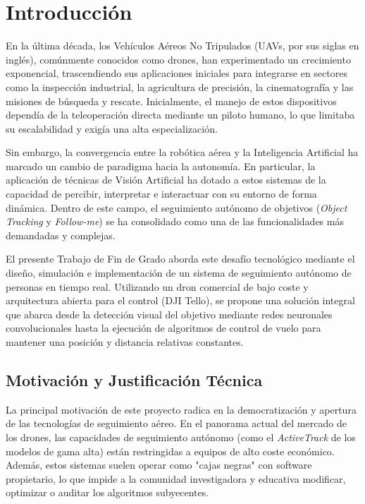 \chapter{Introducción}

En la última década, los Vehículos Aéreos No Tripulados (UAVs, por sus siglas en inglés), comúnmente conocidos como drones, han experimentado un crecimiento exponencial, trascendiendo sus aplicaciones iniciales para integrarse en sectores como la inspección industrial, la agricultura de precisión, la cinematografía y las misiones de búsqueda y rescate. Inicialmente, el manejo de estos dispositivos dependía de la teleoperación directa mediante un piloto humano, lo que limitaba su escalabilidad y exigía una alta especialización.

Sin embargo, la convergencia entre la robótica aérea y la Inteligencia Artificial ha marcado un cambio de paradigma hacia la autonomía. En particular, la aplicación de técnicas de Visión Artificial ha dotado a estos sistemas de la capacidad de percibir, interpretar e interactuar con su entorno de forma dinámica. Dentro de este campo, el seguimiento autónomo de objetivos (\textit{Object Tracking} y \textit{Follow-me}) se ha consolidado como una de las funcionalidades más demandadas y complejas.

El presente Trabajo de Fin de Grado aborda este desafío tecnológico mediante el diseño, simulación e implementación de un sistema de seguimiento autónomo de personas en tiempo real. Utilizando un dron comercial de bajo coste y arquitectura abierta para el control (DJI Tello), se propone una solución integral que abarca desde la detección visual del objetivo mediante redes neuronales convolucionales hasta la ejecución de algoritmos de control de vuelo para mantener una posición y distancia relativas constantes.

\section{Motivación y Justificación Técnica}

La principal motivación de este proyecto radica en la democratización y apertura de las tecnologías de seguimiento aéreo. En el panorama actual del mercado de los drones, las capacidades de seguimiento autónomo (como el \textit{ActiveTrack} de los modelos de gama alta) están restringidas a equipos de alto coste económico. Además, estos sistemas suelen operar como "cajas negras" con software propietario, lo que impide a la comunidad investigadora y educativa modificar, optimizar o auditar los algoritmos subyecentes.

